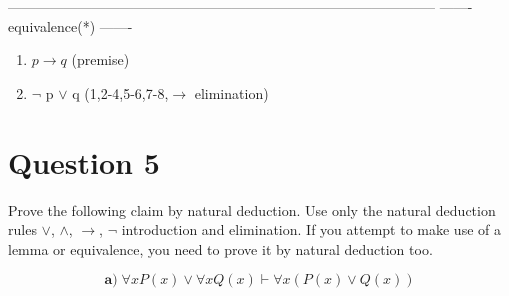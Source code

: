 \documentclass[a4paper,12pt]{article}
\newcommand\tab[1][1cm]{\hspace*{#1}}
\begin{document}
\begin{tcolorbox}
\begin{center}
--------------------------------------------------------------------------------------------\newline
------- equivalence(*) -------
\end{center}
\begin{enumerate}
    \item $p \rightarrow q$ \tab (premise)
    \item $\neg$ p $\vee$ q \tab (1,2-4,5-6,7-8,$\rightarrow$ elimination)
\end{enumerate}


\end{tcolorbox}

\section*{Question 5 \hfill {}}
\tab Prove the following claim by natural deduction. Use only the natural deduction rules $\vee$, $\wedge$, $\rightarrow$, $\neg$ introduction and elimination. If you attempt to make use of a lemma or equivalence, you need to prove it by natural deduction too.


\begin{equation*}
    \textbf{a)} \; \forall x P(x) \vee \forall x Q(x) \vdash \forall x (P(x) \vee Q(x)) 
\end{equation*}
\end{document}

